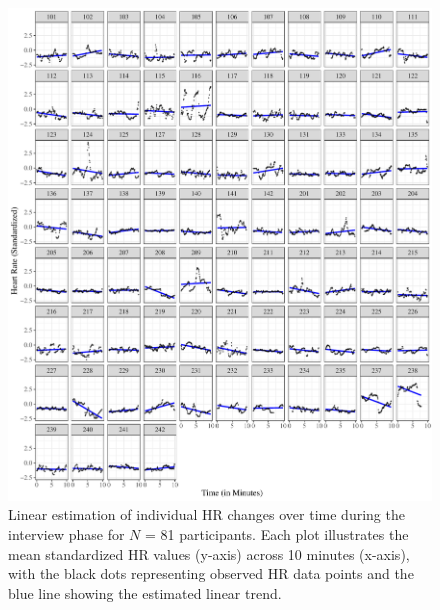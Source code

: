\documentclass[preprint,
3p]{elsarticle} %
\begin{document}
\begin{figure}[htbp]
  \centering
  \includegraphics[width=1\textwidth]{plots_publication/plot_interview_appendix.pdf}
  \caption{Linear estimation of individual HR changes over time during the interview phase for $N$ = 81 participants. Each plot illustrates the mean standardized HR values (y-axis) across 10 minutes (x-axis), with the black dots representing observed HR data points and the blue line showing the estimated linear trend.}
  \label{fig.a6}
\end{figure}
\end{document}
